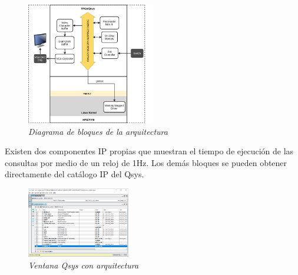 \documentclass[conference]{IEEEtran}
\begin{document}
\begin{figure}[h]
	\centerline{\includegraphics[width=0.5\textwidth]{img/arq.png}}
	\caption{\textit{Diagrama de bloques de la arquitectura}}
	\label{fig:arq01}
\end{figure}
Existen dos componentes IP propias que muestran el tiempo de ejecución de las consultas por medio de un reloj de 1Hz. Los demás bloques se pueden obtener directamente del catálogo IP del Qsys.

\begin{figure}[h]
	\centerline{\includegraphics[width=0.4\textwidth]{img/qsys02.png}}
	\caption{\textit{Ventana Qsys con arquitectura}}
	\label{fig:qsys01}
\end{figure}
\end{document}
